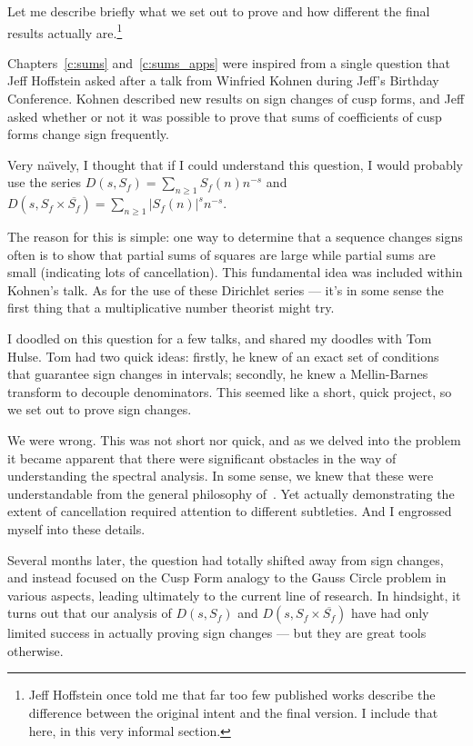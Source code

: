 
Let me describe briefly what we set out to prove and how different the final results
actually are.\footnote{Jeff Hoffstein once told me that far too few published works
  describe the difference between the original intent and the final version.
I include that here, in this very informal section.}


Chapters~\ref{c:sums} and~\ref{c:sums_apps} were inspired from a single question that Jeff
Hoffstein asked after a talk from Winfried Kohnen during Jeff's Birthday Conference.
Kohnen described new results on sign changes of cusp forms, and Jeff asked whether or not
it was possible to prove that sums of coefficients of cusp forms change sign frequently.


Very na{\"\i}vely, I thought that if I could understand this question, I would probably
use the series $D(s, S_f) = \sum_{n \geq 1} S_f(n) n^{-s}$ and $D(s, S_f \times
\overline{S_f}) = \sum_{n \geq 1} \lvert S_f(n) \rvert^s n^{-s}$.


The reason for this is simple: one way to determine that a sequence changes signs often is
to show that partial sums of squares are large while partial sums are small (indicating
lots of cancellation).
This fundamental idea was included within Kohnen's talk.
As for the use of these Dirichlet series --- it's in some sense the first thing that a
multiplicative number theorist might try.


I doodled on this question for a few talks, and shared my doodles with Tom Hulse.
Tom had two quick ideas: firstly, he knew of an exact set of conditions that guarantee
sign changes in intervals; secondly, he knew a Mellin-Barnes transform to decouple
denominators. This seemed like a short, quick project, so we set out to prove sign
changes.


We were wrong.
This was not short nor quick, and as we delved into the problem it became apparent that
there were significant obstacles in the way of understanding the spectral
analysis.
In some sense, we knew that these were understandable from the general philosophy
of~\cite{HoffsteinHulse13}.
Yet actually demonstrating the extent of cancellation required attention to different
subtleties.
And I engrossed myself into these details.


Several months later, the question had totally shifted away from sign changes, and instead
focused on the Cusp Form analogy to the Gauss Circle problem in various aspects, leading
ultimately to the current line of research.
In hindsight, it turns out that our analysis of $D(s, S_f)$ and $D(s, S_f \times
\overline{S_f})$ have had only limited success in actually proving sign changes --- but
they are great tools otherwise.



